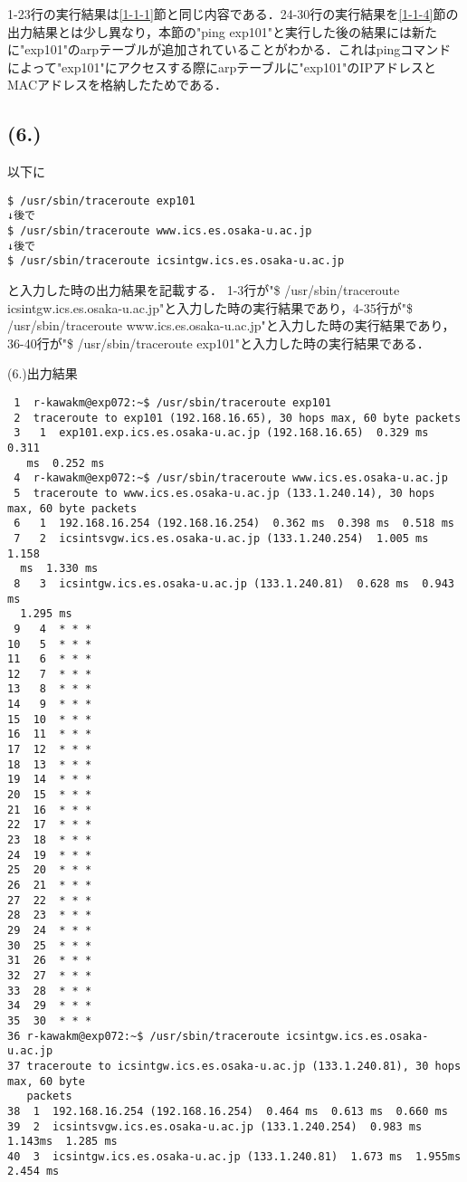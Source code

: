 \documentclass[a4j]{jarticle}
\newenvironment{bit}{\begin{breakitembox}}{\end{breakitembox}} %
\begin{document}
1-23行の実行結果は\ref{1-1-1}節と同じ内容である．24-30行の実行結果を\ref{1-1-4}節の出力結果とは少し異なり，本節の"ping exp101"と実行した後の結果には新たに"exp101"のarpテーブルが追加されていることがわかる．これはpingコマンドによって"exp101"にアクセスする際にarpテーブルに"exp101"のIPアドレスとMACアドレスを格納したためである．

\subsection{(6.)}
\label{sec:6.}

以下に
\begin{verbatim}
$ /usr/sbin/traceroute exp101
↓後で
$ /usr/sbin/traceroute www.ics.es.osaka-u.ac.jp
↓後で
$ /usr/sbin/traceroute icsintgw.ics.es.osaka-u.ac.jp
\end{verbatim}
と入力した時の出力結果を記載する．
1-3行が"\$ /usr/sbin/traceroute icsintgw.ics.es.osaka-u.ac.jp"と入力した時の実行結果であり，4-35行が"\$ /usr/sbin/traceroute www.ics.es.osaka-u.ac.jp"と入力した時の実行結果であり，36-40行が"\$ /usr/sbin/traceroute exp101"と入力した時の実行結果である．

\begin{bit}[l]{(6.)出力結果}
\small{
\begin{verbatim}
 1	r-kawakm@exp072:~$ /usr/sbin/traceroute exp101
 2	traceroute to exp101 (192.168.16.65), 30 hops max, 60 byte packets
 3	 1  exp101.exp.ics.es.osaka-u.ac.jp (192.168.16.65)  0.329 ms  0.311
   ms  0.252 ms
 4	r-kawakm@exp072:~$ /usr/sbin/traceroute www.ics.es.osaka-u.ac.jp
 5	traceroute to www.ics.es.osaka-u.ac.jp (133.1.240.14), 30 hops max, 60 byte packets
 6	 1  192.168.16.254 (192.168.16.254)  0.362 ms  0.398 ms  0.518 ms
 7	 2  icsintsvgw.ics.es.osaka-u.ac.jp (133.1.240.254)  1.005 ms  1.158
  ms  1.330 ms
 8	 3  icsintgw.ics.es.osaka-u.ac.jp (133.1.240.81)  0.628 ms  0.943 ms
  1.295 ms
 9	 4  * * *
10	 5  * * *
11	 6  * * *
12	 7  * * *
13	 8  * * *
14	 9  * * *
15	10  * * *
16	11  * * *
17	12  * * *
18	13  * * *
19	14  * * *
20	15  * * *
21	16  * * *
22	17  * * *
23	18  * * *
24	19  * * *
25	20  * * *
26	21  * * *
27	22  * * *
28	23  * * *
29	24  * * *
30	25  * * *
31	26  * * *
32	27  * * *
33	28  * * *
34	29  * * *
35	30  * * *
36 r-kawakm@exp072:~$ /usr/sbin/traceroute icsintgw.ics.es.osaka-u.ac.jp
37 traceroute to icsintgw.ics.es.osaka-u.ac.jp (133.1.240.81), 30 hops max, 60 byte
   packets
38  1  192.168.16.254 (192.168.16.254)  0.464 ms  0.613 ms  0.660 ms
39  2  icsintsvgw.ics.es.osaka-u.ac.jp (133.1.240.254)  0.983 ms  1.143ms  1.285 ms
40  3  icsintgw.ics.es.osaka-u.ac.jp (133.1.240.81)  1.673 ms  1.955ms  2.454 ms
\end{verbatim}
}
\end{bit}
\end{document}
